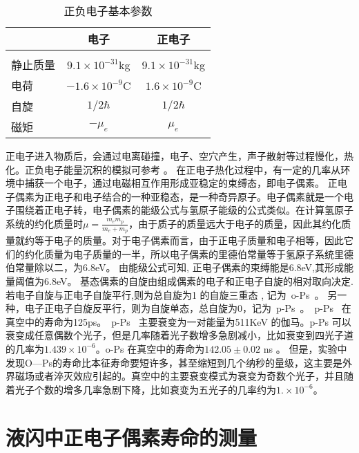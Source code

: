 \begin{table}[htbp]
\centering  %
\begin{tabular}{lcc}  %
\hline
&电子&正电子 \\ \hline  %
\\ 静止质量&$9.1\times10^{-31}$kg& $9.1\times10^{-31}$kg       %
\\  电荷&$-1.6\times10^{-9}$C& $1.6\times10^{-9}$C    %
\\自旋&$1/2\hbar$&$1/2\hbar$
\\磁矩&$-\mu_{e}$&$\mu_{e}$
\\ \hline
\end{tabular}
\caption{正负电子基本参数}
\end{table}
正电子进入物质后，会通过电离碰撞，电子、空穴产生，声子散射等过程慢化，热化。正负电子能量沉积的模拟可参考
\citep{baro1995penelope}。 在正电子热化过程中，有一定的几率从环境中捕获一个电子，通过电磁相互作用形成亚稳定的束缚态，即电子偶素。
正电子偶素为正电子和电子结合的一种亚稳态，是一种奇异原子。电子偶素就是一个电子围绕着正电子转，电子偶素的能级公式与氢原子能级的公式类似。在计算氢原子系统的约化质量时$\mu = \frac{m_em_p}{m_e+m_p}$，由于质子的质量远大于电子的质量，因此其约化质量就约等于电子的质量。对于电子偶素而言，由于正电子质量和电子相等，因此它们的约化质量为电子质量的一半，所以电子偶素的里德伯常量等于氢原子系统里德伯常量除以二，为6.8eV。 由能级公式可知, 正电子偶素的束缚能是6.8eV,其形成能量阈值为6.8eV。
基态偶素的自旋由组成偶素的电子和正电子自旋的相对取向决定. 若电子自旋与正电子自旋平行,则为总自旋为1 的自旋三重态 , 记为~o-Ps~。 另一种，电子正电子自旋反平行，则为自旋单态，总自旋为0，记为~p-Ps~。~p-Ps~ 在真空中的寿命为125ps\citep{karshenboim2004precision}。~p-Ps~ 主要衰变为一对能量为511KeV 的伽马。p-Ps 可以衰变成任意偶数个光子，但是几率随着光子数增多急剧减小，比如衰变到四光子道的几率为$1.439\times10^{-6}$。o-Ps 在真空中的寿命为$142.05\pm0.02$ ns \citep{badertscher2007improved}。 但是，实验中发现O—Ps的寿命比本征寿命要短许多，甚至缩短到几个纳秒的量级，这主要是外界磁场或者淬灭效应引起的。真空中的主要衰变模式为衰变为奇数个光子，并且随着光子个数的增多几率急剧下降，比如衰变为五光子的几率约为$1.\times10^{-6}$。

 \section{液闪中正电子偶素寿命的测量}

